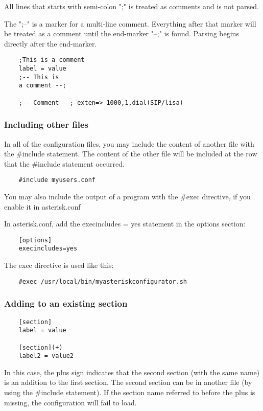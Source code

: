 All lines that starts with semi-colon ";" is treated as comments
and is not parsed.

The ";--" is a marker for a multi-line comment. Everything after
that marker will be treated as a comment until the end-marker "--;"
is found. Parsing begins directly after the end-marker.

\begin{verbatim}
	;This is a comment
	label = value
	;-- This is 
	a comment --;
	
	;-- Comment --; exten=> 1000,1,dial(SIP/lisa)	
\end{verbatim}

\subsubsection{Including other files}
In all of the configuration files, you may include the content of another
file with the \#include statement. The content of the other file will be
included at the row that the \#include statement occurred.
	
\begin{verbatim}
	#include myusers.conf
\end{verbatim}

You may also include the output of a program with the \#exec directive,
if you enable it in asterisk.conf
	
In asterisk.conf, add the execincludes = yes statement in the options
section:
\begin{verbatim}
	[options]
	execincludes=yes
\end{verbatim}

The exec directive is used like this:
	
\begin{verbatim}
	#exec /usr/local/bin/myasteriskconfigurator.sh
\end{verbatim}

\subsubsection{Adding to an existing section}
\begin{verbatim}
	[section] 
	label = value
	
	[section](+)
	label2 = value2	
\end{verbatim}	

In this case, the plus sign indicates that the second section (with the
same name) is an addition to the first section. The second section can
be in another file (by using the \#include statement). If the section
name referred to before the plus is missing, the configuration will fail
to load.

